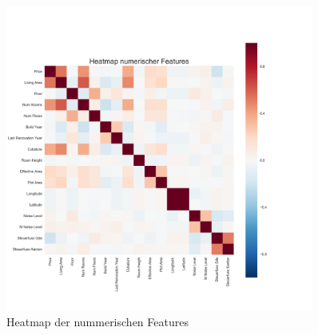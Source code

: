 \begin{figure}[h!]
\centering
\includegraphics[width=0.9\textwidth]{images/Heatmap_numerical.png}
\caption[Heatmap der nummerischen Features]{Heatmap der nummerischen Features}%
\label{fig:heatmap}
\end{figure}
\newline
%
